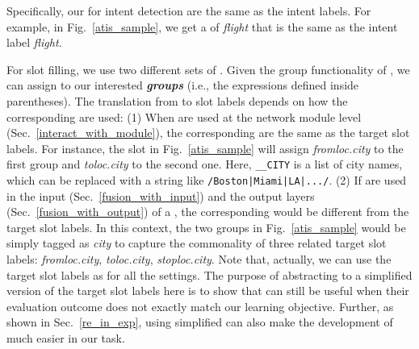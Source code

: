 Specifically, our \REtags for intent detection are the same as the intent labels.
For example,  %
in Fig.~\ref{atis_sample},
we get a \REtag of \emph{flight} that is the same as %
 the intent label \emph{flight}.



For slot filling, we use two different sets of \REs. Given the group functionality of \RE, we can assign \REtags to our interested
\textbf{\emph{\RE groups}} (i.e., the expressions defined inside parentheses). The translation from \REtags to slot labels depends
on how the corresponding \REs are used:
(1) When \REs are used at the network module level (Sec.~\ref{interact_with_module}), the corresponding
\REtags are the same as the target slot labels. %
For instance, the slot
\RE in Fig.~\ref{atis_sample} will assign \emph{fromloc.city} to the first \RE group and \emph{toloc.city} to the second one.
Here,  {\small \texttt{\_\_CITY}} is a list of city names, which can be replaced with a \RE string like
\texttt{\small/Boston|Miami|LA|.../}.
(2) If \REs are used in the input (Sec.~\ref{fusion_with_input}) and the output layers
(Sec.~\ref{fusion_with_output}) of a \NN, the corresponding \REtag would be different from the target slot labels. In this context, the
two \RE groups in Fig.~\ref{atis_sample} would be simply tagged as \emph{city} to capture the commonality of
three related target slot labels: \emph{fromloc.city}, \emph{toloc.city}, \emph{stoploc.city}.
Note that, actually, we can use the target slot labels as \REtags for all the settings.
The purpose of abstracting \REtags to a simplified version of the target slot labels here
is to
show that
\REs can still be useful when their
evaluation outcome does not exactly match our learning objective.
Further, as shown in Sec.~\ref{re_in_exp}, using simplified \REtags can also make the development of \REs much easier in our task.
%
